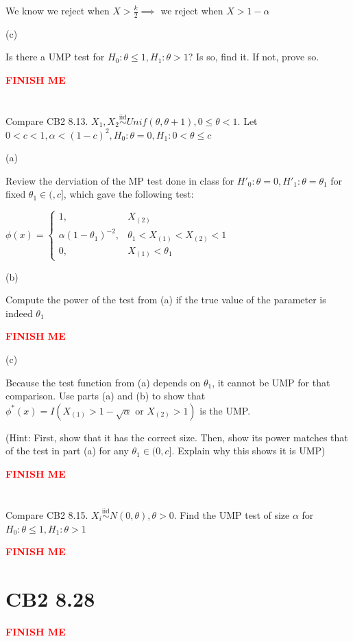 \documentclass{article}
\newcommand{\iiddist}{\overset{\mathrm{iid}}{\sim}}
\newcommand{\boldred}[1]{\textbf{\textcolor{red}{#1}}}
\begin{document}
We know we reject when $X > \frac{k}{2} \implies$ we reject when $X > 1 - \alpha$

(c)

Is there a UMP test for $H_0: \theta \le 1, H_1: \theta > 1$? Is so, find it. If not, prove so. 

\boldred{FINISH ME}


\section{}

Compare CB2 8.13. $X_1, X_2 \iiddist Unif(\theta, \theta+1), 0 \le \theta < 1$. Let $0 < c < 1, \alpha < (1-c)^2, H_0: \theta = 0, H_1: 0 < \theta \le c$

(a)

Review the derviation of the MP test done in class for $H'_0: \theta = 0, H'_1: \theta = \theta_1$ for fixed $\theta_1 \in (,c]$, which gave the following test:

$\phi(x) = \begin{cases} 1, & X_{(2)} \\ \alpha(1-\theta_1)^{-2}, & \theta_1 < X_{(1)} < X_{(2)} < 1 \\ 0, & X_{(1)} < \theta_1 \end{cases}$

(b)

Compute the power of the test from (a) if the true value of the parameter is indeed $\theta_1$

\boldred{FINISH ME}

(c)

Because the test function from (a) depends on $\theta_1$, it cannot be UMP for that comparison. Use parts (a) and (b) to show that $\phi^*(x) = I(X_{(1)} > 1 - \sqrt{\alpha} \text{ or } X_{(2)} > 1)$ is the UMP. 

(Hint: First, show that it has the correct size. Then, show its power matches that of the test in part (a) for any $\theta_1 \in (0,c]$. Explain why this shows it is UMP)

\boldred{FINISH ME}


\section{}

Compare CB2 8.15. $X_i \iiddist N(0, \theta), \theta > 0$. Find the UMP test of size $\alpha$ for $H_0: \theta \le 1, H_1: \theta > 1$

\boldred{FINISH ME}


\section{CB2 8.28}

\boldred{FINISH ME}
\end{document}

